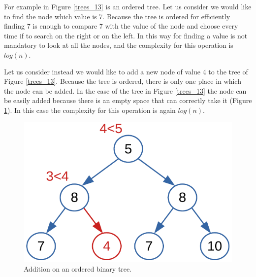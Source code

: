 For example in Figure \ref{trees_13} is an ordered tree. Let us consider we would like to find the node which value is 7. Because the tree is ordered for efficiently finding 7 is enough to compare 7 with the value of the node and choose every time if to search on the right or on the left. In this way for finding a value is not mandatory to look at all the nodes, and the complexity for this operation is \(log(n)\).

Let us consider instead we would like to add a new node of value 4 to the tree of Figure \ref{trees_13}. Because the tree is ordered, there is only one place in which the node can be added. In the case of the tree in Figure \ref{trees_13} the node can be easily added because there is an empty space that can correctly take it (Figure \ref{trees_14}). In this case the complexity for this operation is again \(log(n)\).

\begin{figure}[H]
	\begin{center}
		\includegraphics[scale=.6]{chapters/trees/images/trees_14.pdf}
		\caption[Addition on an ordered binary tree.]{Addition on an ordered binary tree.}
		\label{trees_14}
	\end{center}
\end{figure}

